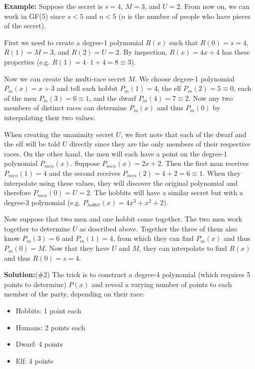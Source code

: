 \documentclass[]{article}
\renewcommand{\answer}[1]{{\color{mydarkblue}\textbf{Solution:}#1}}
\begin{document}
\begin{qunlist}
{{\textbf{Example:} Suppose the secret is $s=4$, $M=3$, and $U=2$. From now on, we can work in GF(5) since $s<5$ and $n<5$ ($n$ is the number of people who have pieces of the secret).

First we need to create a degree-1 polynomial $R(x)$ such that $R(0)=s=4$, $R(1)=M=3$, and $R(2)=U=2$. By inspection, $R(x) = 4x + 4$ has these properties (e.g. $R(1) = 4\cdot1 + 4 = 8 \equiv 3$).

Now we can create the multi-race secret $M$. We choose degree-1 polynomial $P_m(x) = x+3$ and tell each hobbit $P_m(1)=4$, the elf $P_m(2)=5\equiv0$, each of the men $P_m(3)=6 \equiv 1$, and the dwarf $P_m(4) = 7 \equiv 2$. Now any two members of distinct races can determine $P_m(x)$ and thus $P_m(0)$ by interpolating their two values.

When creating the unanimity secret $U$, we first note that each of the dwarf and the elf will be told $U$ directly since they are the only members of their respective races. On the other hand, the men will each have a point on the degree-1 polynomial $P_{men}(x)$. Suppose $P_{men}(x) = 2x+2$. Then the first man receives $P_{men}(1) = 4$ and the second receives $P_{men}(2) = 4+2 = 6 \equiv 1$. When they interpolate using these values, they will discover the original polynomial and therefore $P_{men}(0) = U = 2$. The hobbits will have a similar secret but with a degree-3 polynomial (e.g. $P_{hobbit}(x) = 4x^3 + x^2 + 2$).

Now suppose that two men and one hobbit come together. The two men work together to determine $U$ as described above. Together the three of them also know $P_m(3)=6$ and $P_m(1)=4$, from which they can find $P_m(x)$ and thus $P_m(0) = M$. Now that they have $U$ and $M$, they can interpolate to find $R(x)$ and thus $R(0) = s = 4$.




\answer (\#2) The trick is to construct a degree-4 polynomial (which requires 5 points to determine) $P(x)$ and reveal a varying number of points to each member of the party, depending on their race:

\begin{itemize}
	\item Hobbits: 1 point each
	\item Humans: 2 points each
	\item Dwarf: 4 points
	\item Elf: 4 points
\end{itemize}

}}
\end{qunlist}
\end{document}
